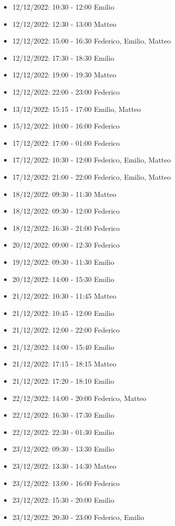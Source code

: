 \begin{itemize}
    \item 12/12/2022: 10:30 - 12:00 Emilio
    \item 12/12/2022: 12:30 - 13:00 Matteo
    \item 12/12/2022: 15:00 - 16:30 Federico, Emilio, Matteo
    \item 12/12/2022: 17:30 - 18:30 Emilio
    \item 12/12/2022: 19:00 - 19:30 Matteo
    \item 12/12/2022: 22:00 - 23:00 Federico
    \item 13/12/2022: 15:15 - 17:00 Emilio, Matteo
    \item 15/12/2022: 10:00 - 16:00 Federico
    \item 17/12/2022: 17:00 - 01:00 Federico
    \item 17/12/2022: 10:30 - 12:00 Federico, Emilio, Matteo
    \item 17/12/2022: 21:00 - 22:00 Federico, Emilio, Matteo
    \item 18/12/2022: 09:30 - 11:30 Matteo
    \item 18/12/2022: 09:30 - 12:00 Federico
    \item 18/12/2022: 16:30 - 21:00 Federico
    \item 20/12/2022: 09:00 - 12:30 Federico
    \item 19/12/2022: 09:30 - 11:30 Emilio
    \item 20/12/2022: 14:00 - 15:30 Emilio
    \item 21/12/2022: 10:30 - 11:45 Matteo
    \item 21/12/2022: 10:45 - 12:00 Emilio
    \item 21/12/2022: 12:00 - 22:00 Federico
    \item 21/12/2022: 14:00 - 15:40 Emilio
    \item 21/12/2022: 17:15 - 18:15 Matteo
    \item 21/12/2022: 17:20 - 18:10 Emilio
    \item 22/12/2022: 14:00 - 20:00 Federico, Matteo
    \item 22/12/2022: 16:30 - 17:30 Emilio
    \item 22/12/2022: 22:30 - 01:30 Emilio
    \item 23/12/2022: 09:30 - 13:30 Emilio
    \item 23/12/2022: 13:30 - 14:30 Matteo
    \item 23/12/2022: 13:00 - 16:00 Federico
    \item 23/12/2022: 15:30 - 20:00 Emilio
    \item 23/12/2022: 20:30 - 23:00 Federico, Emilio
\end{itemize}